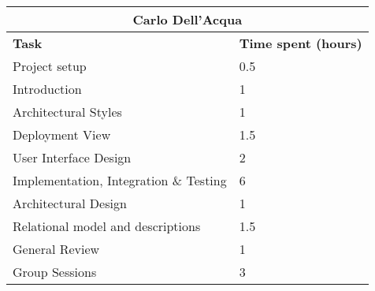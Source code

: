 \begin{table}[H]
  \centering
  \begin{tabular}{l|l}
    \multicolumn{2}{c}{\textbf{Carlo Dell'Acqua}} \\
    \hline
    \textbf{Task} & \textbf{Time spent (hours)}\\
    \hline
    Project setup & 0.5 \\
    Introduction & 1 \\
    Architectural Styles & 1 \\
    Deployment View & 1.5 \\
    User Interface Design & 2 \\
    Implementation, Integration \& Testing & 6 \\
    Architectural Design & 1 \\
    Relational model and descriptions & 1.5 \\
    General Review & 1 \\
    Group Sessions & 3 \\
  \end{tabular}
\end{table}